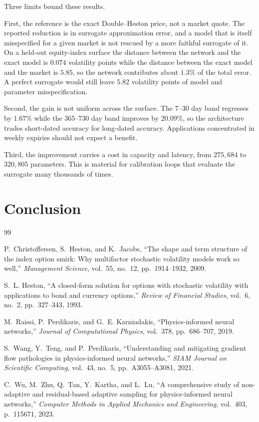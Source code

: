 \documentclass[conference]{IEEEtran}
\begin{document}
Three limits bound these results.

First, the reference is the exact Double--Heston price, not a market quote. The
reported reduction is in surrogate approximation error, and a model that is
itself misspecified for a given market is not rescued by a more faithful
surrogate of it. On a held-out equity-index surface the distance between the
network and the exact model is $0.074$ volatility points while the distance
between the exact model and the market is $5.85$, so the network contributes
about $1.3\%$ of the total error. A perfect surrogate would still leave
$5.82$ volatility points of model and parameter misspecification.

Second, the gain is not uniform across the surface. The $7$--$30$ day band
regresses by $1.67\%$ while the $365$--$730$ day band improves by $20.09\%$, so
the architecture trades short-dated accuracy for long-dated accuracy.
Applications concentrated in weekly expiries should not expect a benefit.

Third, the improvement carries a cost in capacity and latency, from $275{,}684$
to $320{,}805$ parameters. This is material for calibration loops that evaluate
the surrogate many thousands of times.

\section{Conclusion}

\begin{thebibliography}{99}

P.~Christoffersen, S.~Heston, and K.~Jacobs,
``The shape and term structure of the index option smirk: Why multifactor
stochastic volatility models work so well,''
\emph{Management Science}, vol.~55, no.~12, pp.~1914--1932, 2009.

S.~L. Heston,
``A closed-form solution for options with stochastic volatility with
applications to bond and currency options,''
\emph{Review of Financial Studies}, vol.~6, no.~2, pp.~327--343, 1993.

M.~Raissi, P.~Perdikaris, and G.~E. Karniadakis,
``Physics-informed neural networks,''
\emph{Journal of Computational Physics}, vol.~378, pp.~686--707, 2019.

S.~Wang, Y.~Teng, and P.~Perdikaris,
``Understanding and mitigating gradient flow pathologies in physics-informed
neural networks,''
\emph{SIAM Journal on Scientific Computing}, vol.~43, no.~5,
pp.~A3055--A3081, 2021.

C.~Wu, M.~Zhu, Q.~Tan, Y.~Kartha, and L.~Lu,
``A comprehensive study of non-adaptive and residual-based adaptive sampling
for physics-informed neural networks,''
\emph{Computer Methods in Applied Mechanics and Engineering}, vol.~403,
p.~115671, 2023.

\end{thebibliography}
\end{document}
